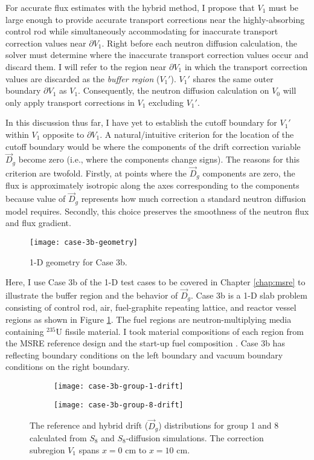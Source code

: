 For accurate flux estimates with the hybrid method, I propose that $V_1$ must be large enough to
provide accurate transport corrections near the highly-absorbing control rod while simultaneously
accommodating for inaccurate transport correction values near $\partial V_1$. Right before each
neutron diffusion calculation, the solver must determine where the inaccurate transport correction
values occur and discard them. I will refer to the region near $\partial V_1$ in which the
transport correction values are discarded as the \textit{buffer region} ($V_1'$).
$V_1'$ shares the same outer boundary $\partial V_1$ as $V_1$. Consequently, the neutron
diffusion calculation on $V_0$ will only apply transport corrections in $V_1$ excluding $V_1'$.

In this discussion thus far, I have yet to establish the cutoff boundary for $V_1'$ within $V_1$
opposite to $\partial V_1$. A natural/intuitive criterion for the location of the cutoff boundary
would be where the components of the drift correction variable $\vec{D}_g$ become zero (i.e.,
where the components change signs). The reasons for this criterion are twofold. Firstly, at
points where the $\vec{D}_g$ components are zero, the flux is approximately isotropic along the
axes corresponding to the components because value of $\vec{D}_g$ represents how much correction a
standard neutron diffusion model requires. Secondly, this choice preserves the smoothness of the
neutron flux and flux gradient.
%
\begin{figure}[htb!]
	\centering
	\texttt{[image: case-3b-geometry]}
	\caption{1-D geometry for Case 3b.}
	\label{fig:3b-geometry}
\end{figure}

Here, I use Case 3b of the 1-D test cases to be covered in Chapter \ref{chap:msre}
to illustrate the buffer region and the behavior of $\vec{D}_g$. Case 3b is a 1-D slab problem
consisting of control rod, air, fuel-graphite repeating lattice, and reactor vessel regions as
shown in Figure \ref{fig:3b-geometry}. The fuel regions are neutron-multiplying media containing
$^\text{235}$U fissile material. I took material compositions of each region from the \gls{MSRE}
reference design and the start-up fuel composition \cite{fratoni_molten_2020}.
Case 3b has reflecting boundary conditions on the left boundary and vacuum boundary conditions on
the right boundary.
%
\begin{figure}[htb!]
    \centering
    \begin{subfigure}[t]{.49\textwidth}
        \centering
        \texttt{[image: case-3b-group-1-drift]}
    \end{subfigure}
    \hfill
    \begin{subfigure}[t]{.49\textwidth}
        \centering
        \texttt{[image: case-3b-group-8-drift]}
    \end{subfigure}
    \caption{The reference and hybrid drift ($\vec{D}_g$) distributions for group 1 and 8 calculated
      from $S_8$ and $S_8$-diffusion simulations. The correction subregion $V_1$ spans $x=0$ cm to
      $x=10$ cm.}
    \label{fig:3b-drift-1}
\end{figure}

